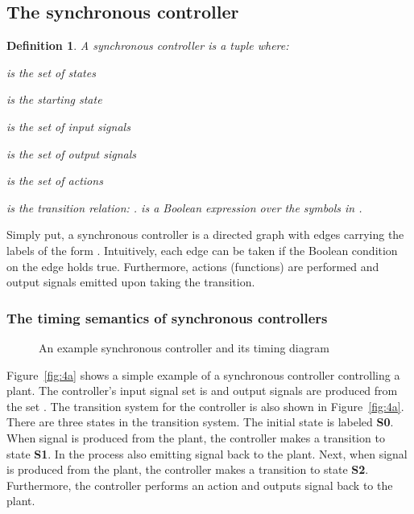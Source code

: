 \documentclass[10pt,journal,cspaper,compsoc]{IEEEtran}
\newtheorem{definition}{Definition}
\begin{document}
\subsection{The synchronous controller}
\label{sec:synchr-model-comp}

\begin{definition}
 A synchronous controller is a tuple  where:
 \begin{compactitem}
 \item  is the set of states
 \item  is the starting state
 \item  is the set of input signals
 \item  is the set of output signals
 \item  is the set of actions
 \item  is the transition relation: .  is a
   Boolean expression over the symbols in .
 \end{compactitem}
\end{definition}

Simply put, a synchronous controller is a directed graph with edges
carrying the labels of the form . Intuitively, each edge can be taken if the
Boolean condition on the edge holds true. Furthermore, actions
(functions) are performed and output signals emitted upon taking the
transition.  

\subsubsection{The timing semantics of synchronous controllers}
\label{sec:timing-semant-synchr}

\begin{figure}[t!]
  \centering 
  \caption{An example synchronous controller and its timing diagram}
  \label{fig:4}
\end{figure}

Figure~\ref{fig:4a} shows a simple example of a synchronous controller
controlling a plant. The controller's input signal set is 
and output signals are produced from the set . The
transition system for the controller is also shown in
Figure~\ref{fig:4a}. There are three states in the transition
system. The initial state is labeled \textbf{S0}. When signal  is
produced from the plant, the controller makes a transition to state
\textbf{S1}. In the process also emitting signal  back to the
plant. Next, when signal  is produced from the plant, the controller
makes a transition to state \textbf{S2}. Furthermore, the controller
performs an action  and outputs signal  back to the plant.
\end{document}

